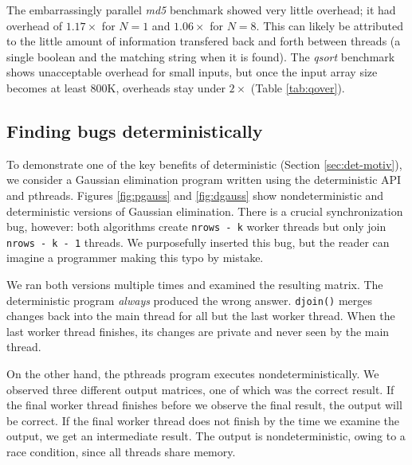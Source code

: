 The embarrassingly parallel \emph{md5} benchmark showed very little overhead; it
had overhead of $1.17\times$ for $N=1$ and $1.06\times$ for $N=8$. This
can likely be attributed to the little amount of information transfered back and
forth between threads (a single boolean and the matching string when it is
found). The \emph{qsort} benchmark shows unacceptable overhead for small inputs,
but once the input array size becomes at least 800K, overheads stay under
$2\times$ (Table \ref{tab:qover}).

\subsection{Finding bugs deterministically}

To demonstrate one of the key benefits of deterministic (Section
\ref{sec:det-motiv}), we consider a Gaussian elimination program written using
the deterministic API and pthreads. Figures \ref{fig:pgauss} and
\ref{fig:dgauss} show nondeterministic and deterministic versions of Gaussian
elimination. There is a crucial synchronization bug, however: both algorithms
create \mbox{\tt nrows - k} worker threads but only join
\mbox{\tt nrows - k - 1} threads. We purposefully inserted this bug, but the
reader can imagine a programmer making this typo by mistake.

We ran both versions multiple times and examined the resulting matrix.
The deterministic program \emph{always}
produced the wrong answer. {\tt djoin()} merges changes back into the main
thread for all but the last worker thread. When the last worker thread
finishes, its changes are private and never seen by the main thread.

On the other hand, the pthreads program executes nondeterministically. We
observed three different output matrices, one of which was the correct result.
If the final worker thread finishes before we observe the final result, the
output will be correct. If the final worker thread does not finish by the time
we examine the output, we get an intermediate result. The output is
nondeterministic, owing to a race condition, since all threads share memory.


